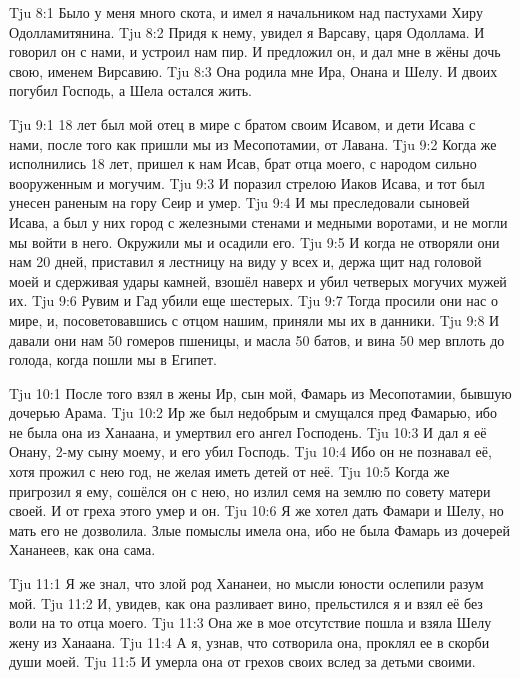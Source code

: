 \vs Tju 8:1
Было у меня много скота, и имел я начальником над пастухами
Хиру Одолламитянина.
\vs Tju 8:2
Придя к нему, увидел я Варсаву, царя Одоллама.
И говорил он с нами, и устроил нам пир.
И предложил он, и дал мне в жёны дочь свою, именем Вирсавию.
\vs Tju 8:3
Она родила мне Ира, Онана и Шелу.
И двоих погубил Господь, а Шела остался жить.

\vs Tju 9:1
18 лет был мой отец в мире с братом своим Исавом,
и дети Исава с нами, после того как пришли мы из Месопотамии, от Лавана.
\vs Tju 9:2
Когда же исполнились 18 лет, пришел к нам Исав, брат отца моего,
с народом сильно вооруженным и могучим.
\vs Tju 9:3
И поразил стрелою Иаков Исава,
и тот был унесен раненым на гору Сеир и умер.
\vs Tju 9:4
И мы преследовали сыновей Исава,
а был у них город с железными стенами и медными воротами,
и не могли мы войти в него.
Окружили мы и осадили его.
\vs Tju 9:5
И когда не отворяли они нам 20 дней,
приставил я лестницу на виду у всех и,
держа щит над головой моей и сдерживая удары камней,
взошёл наверх и убил четверых могучих мужей их.
\vs Tju 9:6
Рувим и Гад убили еще шестерых.
\vs Tju 9:7
Тогда просили они нас о мире, и, посоветовавшись с отцом нашим,
приняли мы их в данники.
\vs Tju 9:8
И давали они нам 50 гомеров пшеницы, и масла 50 батов,
и вина 50 мер вплоть до голода, когда пошли мы в Египет.

\vs Tju 10:1
После того взял в жены Ир, сын мой, Фамарь из Месопотамии,
бывшую дочерью Арама.
\vs Tju 10:2
Ир же был недобрым и смущался пред Фамарью,
ибо не была она из Ханаана, и умертвил его ангел Господень.
\vs Tju 10:3
И дал я её Онану, 2-му сыну моему, и его убил Господь.
\vs Tju 10:4
Ибо он не познавал её, хотя прожил с нею год, не желая иметь детей от неё.
\vs Tju 10:5
Когда же пригрозил я ему, сошёлся он с нею,
но излил семя на землю по совету матери своей.
И от греха этого умер и он.
\vs Tju 10:6
Я же хотел дать Фамари и Шелу, но мать его не дозволила.
Злые помыслы имела она,
ибо не была Фамарь из дочерей Хананеев, как она сама.

\vs Tju 11:1
Я же знал, что злой род Хананеи, но мысли юности ослепили разум мой.
\vs Tju 11:2
И, увидев, как она разливает вино, прельстился я
и взял её без воли на то отца моего.
\vs Tju 11:3
Она же в мое отсутствие пошла и взяла Шелу жену из Ханаана.
\vs Tju 11:4
А я, узнав, что сотворила она, проклял ее в скорби души моей.
\vs Tju 11:5
И умерла она от грехов своих вслед за детьми своими.

